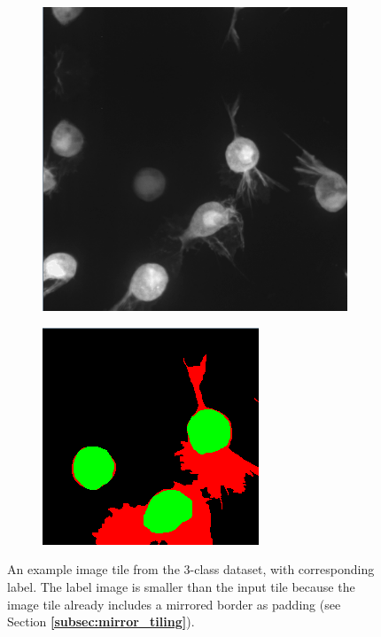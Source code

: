 \begin {figure}[!ht]
	
	\begin {subfigure}[{position=b}]{0.6\linewidth}
		\begin {center}
		\includegraphics[scale=0.65]{img/dataset_ex1.png}
		\end{center}
	\end {subfigure}
	\begin {subfigure}[{position=b}]{0.3\linewidth}
		\begin {center}
		\includegraphics[scale=0.60]{img/dataset_ex2.png}
		\end{center}
	\end {subfigure}

		\caption[]{An example image tile from the 3-class dataset, with corresponding label. The label image is smaller than the input tile because the image tile already includes a mirrored border as padding (see Section \textbf{\ref{subsec:mirror_tiling}}).}
		\label{fig:dataset_example}
	

\end {figure}

